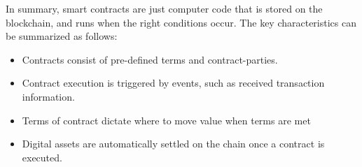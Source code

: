 In summary, smart contracts are just computer code that is stored on the blockchain, and runs when the right conditions occur. The key characteristics can be summarized as follows: 
\begin{itemize}
\item Contracts consist of pre-defined terms and contract-parties.
\item Contract execution is triggered by events, such as received transaction information.
\item Terms of contract dictate where to move value when terms are met
\item Digital assets are automatically settled on the chain once a contract is executed.
\end{itemize}

